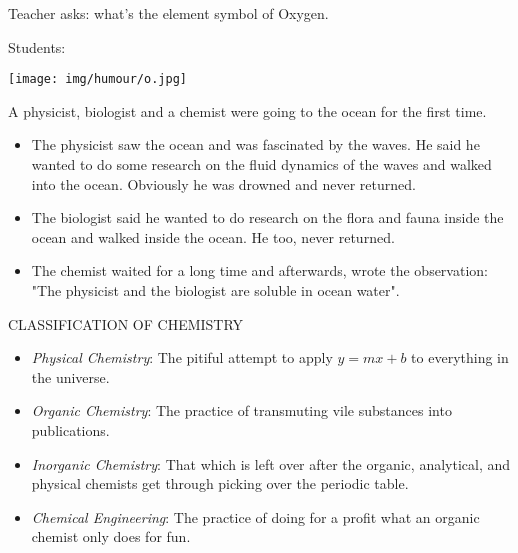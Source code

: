 	\begin{center}\underline{\hspace{5 cm}}\end{center}

	Teacher asks: what's the element symbol of Oxygen.

	Students:
	\begin{center}
		\texttt{[image: img/humour/o.jpg]}	
	\end{center}
	
	\begin{center}\underline{\hspace{5 cm}}\end{center}
	
	A physicist, biologist and a chemist were going to the ocean for the first time. 
	
	\begin{itemize}
		\item The physicist saw the ocean and was fascinated by the waves. He said he wanted to do some research on the fluid dynamics of the waves and walked into the ocean. Obviously he was drowned and never returned. 
	
		\item The biologist said he wanted to do research on the flora and fauna inside the ocean and walked inside the ocean. He too, never returned. 
	
		\item The chemist waited for a long time and afterwards, wrote the observation: "The physicist and the biologist are soluble in ocean water".
	\end{itemize}

	\begin{center}\underline{\hspace{5 cm}}\end{center}
	
	CLASSIFICATION OF CHEMISTRY 
	
	\begin{itemize}
		\item \textit{Physical Chemistry}: The pitiful attempt to apply $y = mx+b$ to everything in the universe.
	
		\item \textit{Organic Chemistry}: The practice of transmuting vile substances into publications.
	
		\item \textit{Inorganic Chemistry}: That which is left over after the organic, analytical, and physical chemists get through picking over the periodic table.
	
		\item \textit{Chemical Engineering}: The practice of doing for a profit what an organic chemist only does for fun.
	\end{itemize}
	\begin{center}\underline{\hspace{5 cm}}\end{center}
	
